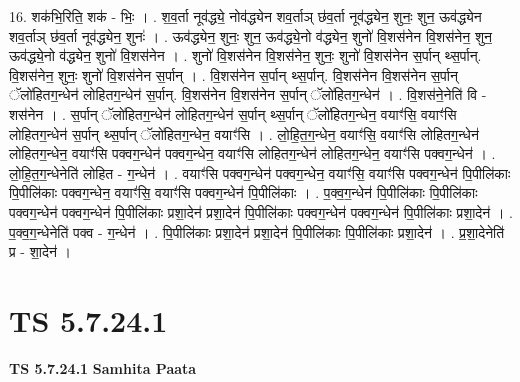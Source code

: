 \documentclass[17pt]{extarticle}
\begin{document}
16. शक॑भि॒रिति॒ शक॑ - भिः॒ । . श॒व॒र्ता नूव॑द्ध्ये॒ नोव॑द्ध्येन शव॒र्ताञ् छ॑व॒र्ता नूव॑द्ध्येन॒ शुनः॒ शुन॒ ऊव॑द्ध्येन शव॒र्ताञ् छ॑व॒र्ता नूव॑द्ध्येन॒ शुनः॑ । . ऊव॑द्ध्येन॒ शुनः॒ शुन॒ ऊव॑द्ध्ये॒नो व॑द्ध्येन॒ शुनो॑ वि॒शस॑नेन वि॒शस॑नेन॒ शुन॒ ऊव॑द्ध्ये॒नो व॑द्ध्येन॒ शुनो॑ वि॒शस॑नेन । . शुनो॑ वि॒शस॑नेन वि॒शस॑नेन॒ शुनः॒ शुनो॑ वि॒शस॑नेन स॒र्पान् थ्स॒र्पान्. वि॒शस॑नेन॒ शुनः॒ शुनो॑ वि॒शस॑नेन स॒र्पान् । . वि॒शस॑नेन स॒र्पान् थ्स॒र्पान्. वि॒शस॑नेन वि॒शस॑नेन स॒र्पान् ॅलो॑हितग॒न्धेन॑ लोहितग॒न्धेन॑ स॒र्पान्. वि॒शस॑नेन वि॒शस॑नेन स॒र्पान् ॅलो॑हितग॒न्धेन॑ । . वि॒शस॑ने॒नेति॑ वि - शस॑नेन । . स॒र्पान् ॅलो॑हितग॒न्धेन॑ लोहितग॒न्धेन॑ स॒र्पान् थ्स॒र्पान् ॅलो॑हितग॒न्धेन॒ वयाꣳ॑सि॒ वयाꣳ॑सि लोहितग॒न्धेन॑ स॒र्पान् थ्स॒र्पान् ॅलो॑हितग॒न्धेन॒ वयाꣳ॑सि । . लो॒हि॒त॒ग॒न्धेन॒ वयाꣳ॑सि॒ वयाꣳ॑सि लोहितग॒न्धेन॑ लोहितग॒न्धेन॒ वयाꣳ॑सि पक्वग॒न्धेन॑ पक्वग॒न्धेन॒ वयाꣳ॑सि लोहितग॒न्धेन॑ लोहितग॒न्धेन॒ वयाꣳ॑सि पक्वग॒न्धेन॑ । . लो॒हि॒त॒ग॒न्धेनेति॑ लोहित - ग॒न्धेन॑ । . वयाꣳ॑सि पक्वग॒न्धेन॑ पक्वग॒न्धेन॒ वयाꣳ॑सि॒ वयाꣳ॑सि पक्वग॒न्धेन॑ पि॒पीलि॑काः पि॒पीलि॑काः पक्वग॒न्धेन॒ वयाꣳ॑सि॒ वयाꣳ॑सि पक्वग॒न्धेन॑ पि॒पीलि॑काः । . प॒क्व॒ग॒न्धेन॑ पि॒पीलि॑काः पि॒पीलि॑काः पक्वग॒न्धेन॑ पक्वग॒न्धेन॑ पि॒पीलि॑काः प्रशा॒देन॑ प्रशा॒देन॑ पि॒पीलि॑काः पक्वग॒न्धेन॑ पक्वग॒न्धेन॑ पि॒पीलि॑काः प्रशा॒देन॑ । . प॒क्व॒ग॒न्धेनेति॑ पक्व - ग॒न्धेन॑ । . पि॒पीलि॑काः प्रशा॒देन॑ प्रशा॒देन॑ पि॒पीलि॑काः पि॒पीलि॑काः प्रशा॒देन॑ । . प्र॒शा॒देनेति॑ प्र - शा॒देन॑ । \newline
\pagebreak
{}

\section{ TS 5.7.24.1 }

\textbf{TS 5.7.24.1 } \newline
\textbf{Samhita Paata} \newline
\end{document}
